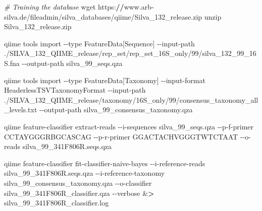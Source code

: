 \documentclass[
]{article}
\newenvironment{Shaded}{\begin{snugshade}}{\end{snugshade}}
\newcommand{\CommentTok}[1]{\textcolor[rgb]{0.56,0.35,0.01}{\textit{#1}}}
\newcommand{\DecValTok}[1]{\textcolor[rgb]{0.00,0.00,0.81}{#1}}
\newcommand{\ErrorTok}[1]{\textcolor[rgb]{0.64,0.00,0.00}{\textbf{#1}}}
\newcommand{\NormalTok}[1]{#1}
\newcommand{\SpecialCharTok}[1]{\textcolor[rgb]{0.00,0.00,0.00}{#1}}
\newcommand{\StringTok}[1]{\textcolor[rgb]{0.31,0.60,0.02}{#1}}
\begin{document}
\begin{Shaded}
\begin{Highlighting}[]
\CommentTok{\# Training the database}
\NormalTok{wget https}\SpecialCharTok{:}\ErrorTok{//}\NormalTok{www.arb}\SpecialCharTok{{-}}\NormalTok{silva.de}\SpecialCharTok{/}\NormalTok{fileadmin}\SpecialCharTok{/}\NormalTok{silva\_databases}\SpecialCharTok{/}\NormalTok{qiime}\SpecialCharTok{/}\NormalTok{Silva\_132\_release.zip}
\NormalTok{unzip Silva\_132\_release.zip}

\NormalTok{qiime tools import }\SpecialCharTok{{-}{-}}\NormalTok{type }\StringTok{\textquotesingle{}FeatureData[Sequence]\textquotesingle{}} \SpecialCharTok{{-}{-}}\NormalTok{input}\SpecialCharTok{{-}}\NormalTok{path .}\SpecialCharTok{/}\NormalTok{SILVA\_132\_QIIME\_release}\SpecialCharTok{/}\NormalTok{rep\_set}\SpecialCharTok{/}\NormalTok{rep\_set\_16S\_only}\SpecialCharTok{/}\DecValTok{99}\SpecialCharTok{/}\NormalTok{silva\_132\_99\_16S.fna  }\SpecialCharTok{{-}{-}}\NormalTok{output}\SpecialCharTok{{-}}\NormalTok{path silva\_99\_seqs.qza}

\NormalTok{qiime tools import }\SpecialCharTok{{-}{-}}\NormalTok{type }\StringTok{\textquotesingle{}FeatureData[Taxonomy]\textquotesingle{}} \SpecialCharTok{{-}{-}}\NormalTok{input}\SpecialCharTok{{-}}\NormalTok{format HeaderlessTSVTaxonomyFormat }\SpecialCharTok{{-}{-}}\NormalTok{input}\SpecialCharTok{{-}}\NormalTok{path .}\SpecialCharTok{/}\NormalTok{SILVA\_132\_QIIME\_release}\SpecialCharTok{/}\NormalTok{taxonomy}\SpecialCharTok{/}\NormalTok{16S\_only}\SpecialCharTok{/}\DecValTok{99}\SpecialCharTok{/}\NormalTok{consensus\_taxonomy\_all\_levels.txt }\SpecialCharTok{{-}{-}}\NormalTok{output}\SpecialCharTok{{-}}\NormalTok{path silva\_99\_consensus\_taxonomy.qza}

\NormalTok{qiime feature}\SpecialCharTok{{-}}\NormalTok{classifier extract}\SpecialCharTok{{-}}\NormalTok{reads }\SpecialCharTok{{-}{-}}\NormalTok{i}\SpecialCharTok{{-}}\NormalTok{sequences silva\_99\_seqs.qza }\SpecialCharTok{{-}{-}}\NormalTok{p}\SpecialCharTok{{-}}\NormalTok{f}\SpecialCharTok{{-}}\NormalTok{primer CCTAYGGGRBGCASCAG }\SpecialCharTok{{-}{-}}\NormalTok{p}\SpecialCharTok{{-}}\NormalTok{r}\SpecialCharTok{{-}}\NormalTok{primer GGACTACHVGGGTWTCTAAT }\SpecialCharTok{{-}{-}}\NormalTok{o}\SpecialCharTok{{-}}\NormalTok{reads silva\_99\_341F806R.seqs.qza}


\NormalTok{qiime feature}\SpecialCharTok{{-}}\NormalTok{classifier fit}\SpecialCharTok{{-}}\NormalTok{classifier}\SpecialCharTok{{-}}\NormalTok{naive}\SpecialCharTok{{-}}\NormalTok{bayes }\SpecialCharTok{{-}{-}}\NormalTok{i}\SpecialCharTok{{-}}\NormalTok{reference}\SpecialCharTok{{-}}\NormalTok{reads silva\_99\_341F806R.seqs.qza }\SpecialCharTok{{-}{-}}\NormalTok{i}\SpecialCharTok{{-}}\NormalTok{reference}\SpecialCharTok{{-}}\NormalTok{taxonomy silva\_99\_consensus\_taxonomy.qza }\SpecialCharTok{{-}{-}}\NormalTok{o}\SpecialCharTok{{-}}\NormalTok{classifier silva\_99\_341F806R\_classifier.qza }\SpecialCharTok{{-}{-}}\NormalTok{verbose }\SpecialCharTok{\&}\ErrorTok{\textgreater{}}\NormalTok{ silva\_99\_341F806R\_classifier.log}
\end{Highlighting}
\end{Shaded}
\end{document}
